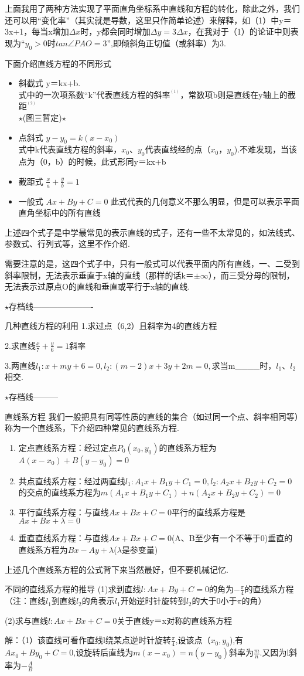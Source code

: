 上面我用了两种方法实现了平面直角坐标系中直线和方程的转化，除此之外，我们还可以用“变化率”（其实就是导数，这里只作简单论述）来解释，如（1）中y＝3x+1，每当x增加$\Delta x$时，y都会同时增加$\Delta y=3\Delta x$，在我对于（1）的论证中则表现为“$y_0>0$时$tan\angle PAO=3$”,即倾斜角正切值（或斜率）为3.

下面介绍直线方程的不同形式
\begin{itemize}
\item 斜截式
y＝kx+b.
\\式中的一次项系数“k”代表直线方程的斜率$^{^{(1)}}$，常数项b则是直线在y轴上的截距$^{^{(2)}}$ 
\\ $\star$(图三暂定)$\star$
\item 点斜式
$y-y_0=k(x-x_0)$
\\式中k代表直线方程的斜率，$x_0$、$y_0$代表直线经的点（$x_0$，$y_0$).不难发现，当该点为（0，b）的时候，此式形同y＝kx+b
\item 截距式
$\frac{x}{a}+\frac{y}{b}=1$
\item 一般式
$Ax+By+C=0$
此式代表的几何意义不那么明显，但是可以表示平面直角坐标中的所有直线
\end{itemize}
上述四个式子是中学最常见的表示直线的式子，还有一些不太常见的，如法线式、参数式、行列式等，这里不作介绍.

需要注意的是，这四个式子中，只有一般式可以代表平面内所有直线，一、二受到斜率限制，无法表示垂直于x轴的直线（那样的话k＝$\pm \infty$），而三受分母的限制，无法表示过原点O的直线和垂直或平行于x轴的直线.

$\star$存档线----------------------
\begin{exercise}{几种直线方程的利用}
1.求过点（6,2）且斜率为4的直线方程


2.求直线$\frac{x}{7}+\frac{y}{6}=1$斜率

3.两直线$l_1:x+my+6=0,l_2:(m-2)x+3y+2m=0,$求当m____时，$l_1$、$l_2$相交.
\end{exercise}
$\star$存档线---------

直线系方程
我们一般把具有同等性质的直线的集合（如过同一个点、斜率相同等）称为一个直线系，下介绍四种常见的直线系方程.
\begin{enumerate}
\item 定点直线系方程：经过定点$P_0(x_0,y_0)$的直线系方程为$A(x-x_0)+B(y-y_0)=0$
\item 共点直线系方程：经过两直线$l_1:A_1x+B_1y+C_1=0,l_2:A_2x+B_2y+C_2=0$的交点的直线系方程为$m(A_1x+B_1y+C_1)+n(A_2x+B_2y+C_2)=0$
\item 平行直线系方程：与直线$Ax+Bx+C=0$平行的直线系方程是$Ax+Bx+\lambda=0$
\item 垂直直线系方程：与直线$Ax+Bx+C=0$(A、B至少有一个不等于0)垂直的直线系方程为$Bx-Ay+\lambda$($\lambda$是参变量)
\end{enumerate}
上述几个直线系方程的公式背下来当然最好，但不要机械记忆.
\begin{example}{不同的直线系方程的推导}
(1)求到直线$l:Ax+By+C=0$的角为$-\frac{\pi}{4}$的直线系方程
\\（注：直线$l_1$到直线$l_2$的角表示$l_1$开始逆时针旋转到$l_2$的大于0小于$\pi$的角）

(2)求与直线$l:Ax+Bx+C=0$关于直线y＝x对称的直线系方程
\end{example}

解：（1）该直线可看作直线l绕某点逆时针旋转$\frac{\pi}{4}$,设该点（$x_0,y_0$),有$Ax_0+By_0+C=0$,设旋转后直线为$m(x-x_0)=n(y-y_0)$斜率为$\frac{m}{n}$.又因为l斜率为$-\frac{A}{B}$
